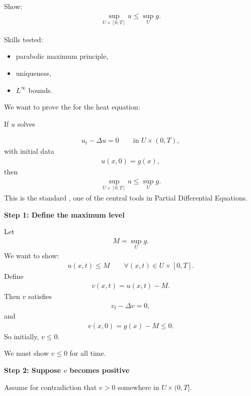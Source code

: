\documentclass[12pt,a4paper]{report}
\begin{document}
\begin{description}
Show:
\begin{align*}
\sup_{U\times[0,T]}u\le \sup_U g.
\end{align*}

Skills tested:
	\begin{itemize}
    \item parabolic maximum principle,
    \item uniqueness,
    \item $L^\infty$ bounds.
	\end{itemize}

\HLINE


We want to prove the  for the heat equation:

If $u$ solves

\begin{align*}
u_t-\Delta u=0
\qquad\text{in }U\times(0,T),
\end{align*}
with initial data
\begin{align*}
u(x,0)=g(x),
\end{align*}
then
\begin{align*}
\sup_{U\times[0,T]}u\le \sup_U g.
\end{align*}
This is the standard , one of the central tools in Partial Differential Equations.

\begin{description}

\item \textbf{Step 1: Define the maximum level}

Let
\begin{align*}
M=\sup_U g.
\end{align*}
We want to show:
\begin{align*}
u(x,t)\le M
\qquad\forall (x,t)\in U\times[0,T].
\end{align*}
Define
\begin{align*}
v(x,t)=u(x,t)-M.
\end{align*}
Then $v$ satisfies
\begin{align*}
v_t-\Delta v=0,
\end{align*}
and
\begin{align*}
v(x,0)=g(x)-M\le 0.
\end{align*}
So initially, $v\le 0$.

We must show $v\le 0$ for all time.

\item \textbf{Step 2: Suppose $v$ becomes positive}

Assume for contradiction that $v>0$ somewhere in $U\times(0,T]$.


\end{description}
\end{description}
\end{document}
